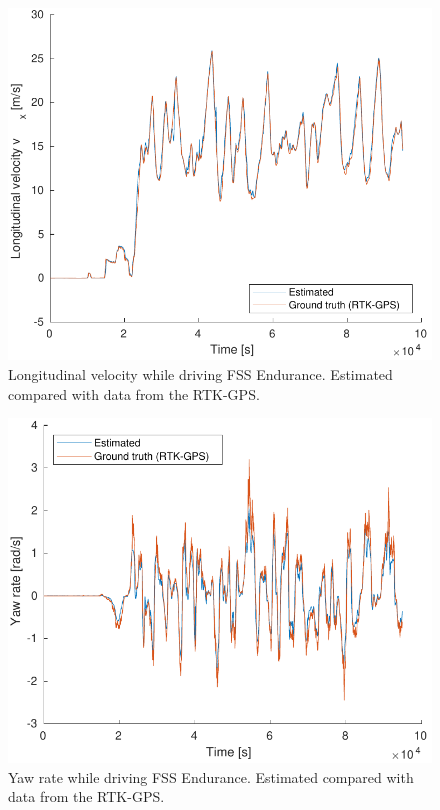 \begin{figure}
    \centering
    \includegraphics[width=0.8\linewidth]{0_Images/6_Results/vxFSSEndurance.pdf}
    \caption[Longitudinal velocity while driving FSS Endurance.]
    {Longitudinal velocity  while driving FSS Endurance. Estimated compared with data from the RTK-GPS.}
    \label{Fig:VxFSSEndurance}
\end{figure}

\begin{figure}
    \centering
    \includegraphics[width=0.8\linewidth]{0_Images/6_Results/rFSSEndurance.pdf}
    \caption[Yaw rate while driving FSS Endurance.]
    {Yaw rate  while driving FSS Endurance. Estimated compared with data from the RTK-GPS.}
    \label{Fig:RFSSEndurance}
\end{figure}

